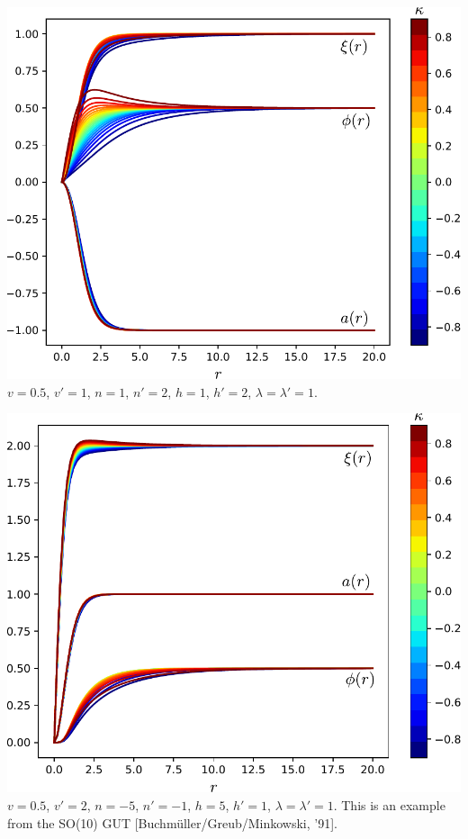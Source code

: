 \documentclass[14pt]{beamer}
\begin{document}
\begin{frame}
  \includegraphics[scale=0.6]{chapters/figures/Figure_1.pdf} %
$v = 0.5$, $v'=1$, $n=1$, $n'=2$, $h=1$, $h'=2$, $\lambda=\lambda'=1$.
\end{frame}
%
\begin{frame}
\includegraphics[scale=0.5]{chapters/figures/n-5h5np-1hp1l1lp1v05vp2.pdf} %
$v = 0.5$, $v'=2$, $n=-5$, $n'=-1$, $h=5$, $h'=1$, $\lambda=\lambda'=1$. This is an example from the SO(10) GUT [Buchm\"uller/Greub/Minkowski, '91].
\end{frame}
\end{document}
